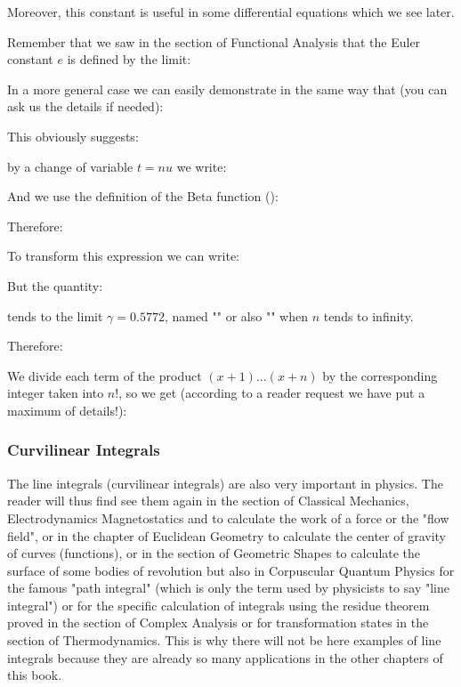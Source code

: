 	Moreover, this constant is useful in some differential equations which we see later.
	
	Remember that we saw in the section of Functional Analysis that the Euler constant $e$ is defined by the limit:
	
	
	In a more general case we can easily demonstrate in the same way that (you can ask us the details if needed):	
	
	This obviously suggests:
	
	by a change of variable $t=nu$ we write:
	
	And we use the definition of the Beta function ():
	
	Therefore:
	
	To transform this expression we can write:
	
	But the quantity:
	
	tends to the limit $\gamma=0.5772$, named "" or also "" when $n$ tends to infinity.
	
	Therefore:
	
	We divide each term of the product $(x+1)...(x+n)$ by the corresponding integer taken into $n!$, so we get (according to a reader request we have put a maximum of details!):
    
	
	\pagebreak
	\subsubsection{Curvilinear Integrals}\label{curvilinear integral}
	The line integrals (curvilinear integrals) are also very important in physics. The reader will thus find see them again in the section of Classical Mechanics, Electrodynamics Magnetostatics and to calculate the work of a force or the "flow field", or in the chapter of Euclidean Geometry to calculate the center of gravity of curves (functions), or in the section of Geometric Shapes to calculate the surface of some bodies of revolution but also in Corpuscular Quantum Physics for the famous "path integral" (which is only the term used by physicists to say "line integral") or for the specific calculation of integrals using the residue theorem proved in the section of Complex Analysis or for transformation states in the section of Thermodynamics. This is why there will not be here examples of line integrals because they are already so many applications in the other chapters of this book.
	
